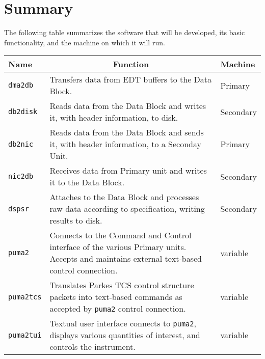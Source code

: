 \chapter{Summary}

The following table summarizes the software that will be developed,
its basic functionality, and the machine on which it will run.

\vspace{5mm}

\begin{tabular}{l|p{8cm}|l}

Name & \multicolumn{1}{c}{Function} & Machine \\ \hline

{\tt dma2db} & Transfers data from EDT buffers to the Data Block.
	& Primary \\

{\tt db2disk} & Reads data from the Data Block and writes it, with
	header information, to disk. & Secondary \\

{\tt db2nic} & Reads data from the Data Block and sends it, with
	header information, to a Seconday Unit. & Primary \\

{\tt nic2db} & Receives data from Primary unit and writes it to the 
	Data Block. & Secondary \\

{\tt dspsr} & Attaches to the Data Block and processes raw data
	according to specification, writing results to disk. &
	Secondary \\

{\tt puma2} & Connects to the Command and Control interface of the
	various Primary units.  Accepts and maintains external
	text-based control connection.  & variable \\

{\tt puma2tcs} & Translates Parkes TCS control structure packets into
	text-based commands as accepted by {\tt puma2} control
	connection.  & variable \\

{\tt puma2tui} & Textual user interface connects to {\tt puma2},
	displays various quantities of interest, and controls
	the instrument. & variable \\

\end{tabular}
